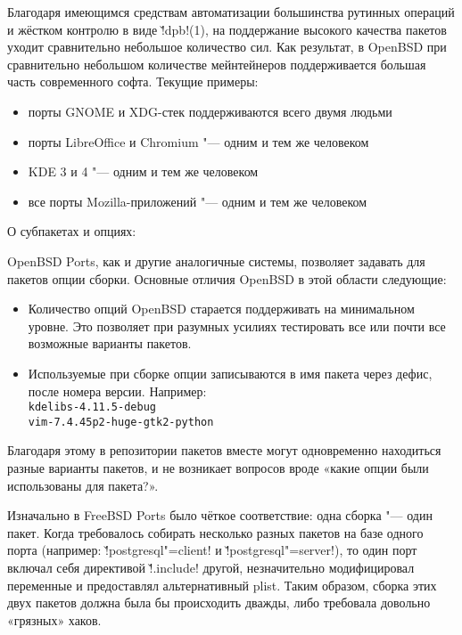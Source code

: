\documentclass[10pt, a5paper]{article}
\begin{document}
Благодаря имеющимся средствам автоматизации большинства рутинных операций и жёстком контролю в виде \v!dpb!(1), на поддержание высокого качества пакетов уходит сравнительно небольшое количество сил. Как результат, в OpenBSD при сравнительно небольшом количестве мейнтейнеров поддерживается большая часть современного софта. Текущие примеры:

\begin{itemize}
  \item порты GNOME и XDG-стек поддерживаются всего двумя \linebreak людьми
  \item порты LibreOffice и Chromium "--- одним и тем же человеком
  \item KDE 3 и 4 "--- одним и тем же человеком
  \item все порты Mozilla-приложений "--- одним и тем же человеком
\end{itemize}

О субпакетах и опциях:

OpenBSD Ports, как и другие аналогичные системы, позволяет задавать для пакетов опции сборки. Основные отличия OpenBSD в этой области следующие:

\begin{itemize}
  \item Количество опций OpenBSD старается поддерживать на минимальном уровне. Это позволяет при разумных усилиях тестировать все или почти все возможные варианты пакетов.
  \item Используемые при сборке опции записываются в имя пакета через дефис, после номера версии. Например:\\
\verb!kdelibs-4.11.5-debug!\\
\verb!vim-7.4.45p2-huge-gtk2-python!
\end{itemize}


Благодаря этому в репозитории пакетов вместе могут одновременно находиться разные варианты пакетов, и не возникает вопросов вроде «какие опции были использованы для пакета?».

Изначально в FreeBSD Ports было чёткое соответствие: одна сборка "--- один пакет. Когда требовалось собирать несколько разных пакетов на базе одного порта (например: \v!postgresql"=client! и \v!postgresql"=server!), то один порт включал себя директивой \v!.in\-clu\-de! другой, незначительно модифицировал переменные и предоставлял альтернативный plist. Таким образом, сборка этих двух пакетов должна была бы происходить дважды, либо требовала довольно «грязных» хаков.
\end{document}
